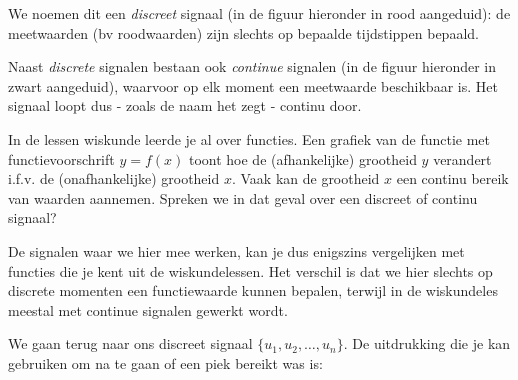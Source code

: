 \begin{opmerking}
	We noemen dit een \emph{discreet} signaal (in de figuur hieronder in rood aangeduid): de meetwaarden (bv roodwaarden) zijn slechts op bepaalde tijdstippen bepaald. 
	
	Naast \emph{discrete} signalen bestaan ook \emph{continue} signalen (in de figuur hieronder in zwart aangeduid), waarvoor op elk moment een meetwaarde beschikbaar is. Het signaal loopt dus - zoals de naam het zegt - continu door.
	
	
%	
\end{opmerking}

\begin{oef}
	In de lessen wiskunde leerde je al over functies. Een grafiek van de functie met functievoorschrift $y=f(x)$ toont hoe de (afhankelijke) grootheid $y$ verandert i.f.v. de (onafhankelijke) grootheid $x$. Vaak kan de grootheid $x$ een continu bereik van waarden aannemen. Spreken we in dat geval over een discreet of continu signaal?
\end{oef}

De signalen waar we hier mee werken, kan je dus enigszins vergelijken met functies die je kent uit de wiskundelessen. 
Het verschil is dat we hier slechts op discrete momenten een functiewaarde kunnen bepalen, terwijl in de wiskundeles meestal met continue signalen gewerkt wordt.

We gaan terug naar ons discreet signaal $\{ u_1, u_2, \ldots, u_n\}$. De uitdrukking die je kan gebruiken om na te gaan of een piek bereikt was is:


